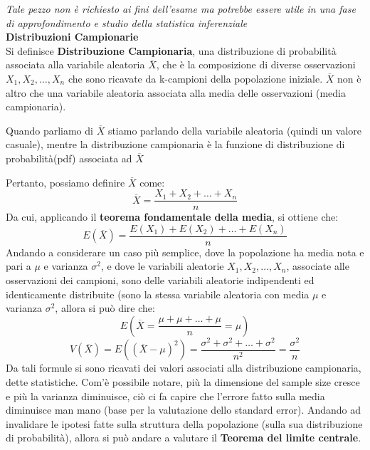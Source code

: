 \clearpage
\begin{info}\label{inf:distribuzioni-Campionarie}
\textit{Tale pezzo non è richiesto ai fini dell'esame ma potrebbe essere utile in una fase di approfondimento e studio della statistica inferenziale}
    \\
\textbf{Distribuzioni Campionarie}\\
Si definisce \textbf{Distribuzione Campionaria}, una distribuzione di probabilità associata alla variabile aleatoria \(\overline{X}\), che è la composizione di diverse osservazioni \(X_1, X_2, \dots, X_n\) che sono ricavate da k-campioni della popolazione iniziale. \(\overline{X}\) non è altro che una variabile aleatoria associata alla media delle osservazioni (media campionaria).
\begin{warn}
Quando parliamo di \(\overline{X}\) stiamo parlando della variabile aleatoria (quindi un valore casuale), mentre la distribuzione campionaria è la funzione di distribuzione di probabilità(pdf) associata ad \(\overline{X}\)
\end{warn}

Pertanto, possiamo definire \(\overline{X}\) come:
\[
\overline{X} = \frac{X_1 + X_2 + \dots + X_n}{n}
\]
Da cui, applicando il \textbf{teorema fondamentale della media}, si ottiene che:
\[
E(\overline{X}) = \frac{E(X_1) + E(X_2) + \dots + E(X_n)}{n}
\]
Andando a considerare un caso più semplice, dove la popolazione ha media nota e pari a \(\mu\) e varianza \(\sigma^2\), e dove le variabili aleatorie \(X_1, X_2, \dots, X_n\), associate alle osservazioni dei campioni, sono delle variabili aleatorie indipendenti ed identicamente distribuite (sono la stessa variabile aleatoria con media \(\mu\) e varianza \(\sigma^2\), allora si può dire che:
\[
E(\overline{X} = \frac{\mu + \mu + \dots + \mu}{n} = \mu)
\]
\[
V(\overline{X}) = E((\overline{X} - \mu)^2) = \frac{\sigma^2 + \sigma^2 + \dots + \sigma^2}{n^2} = \frac{\sigma^2}{n}
\]
Da tali formule si sono ricavati dei valori associati alla distribuzione campionaria, dette statistiche. Com'è possibile notare, più la dimensione del sample size cresce e più la varianza diminuisce, ciò ci fa capire che l'errore fatto sulla media diminuisce man mano (base per la valutazione dello standard error).
Andando ad invalidare le ipotesi fatte sulla struttura della popolazione (sulla sua distribuzione di probabilità), allora si può andare a valutare il \textbf{Teorema del limite centrale}.
\end{info}

